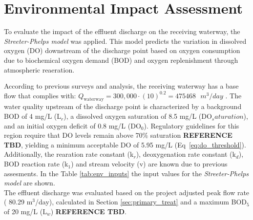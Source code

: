\documentclass[12pt]{article}
\begin{document}
\section{Environmental Impact Assessment}
\label{sec:env_impact}

To evaluate the impact of the effluent discharge on the receiving waterway, 
the \textit{Streeter-Phelps model} was applied. This model predicts the variation in dissolved 
oxygen (DO) downstream of the discharge point based on oxygen consumption due to biochemical 
oxygen demand (BOD) and oxygen replenishment through atmospheric reaeration.

According to previous surveys and analysis, the receiving waterway has a base flow that complies
with: 
\(Q_{\text{waterway}} = 300{,}000 \cdot \left(\text{10}\right)^{0.2} = 475468 \text{ } m^3/day\)
. The water quality upstream 
of the discharge point is characterized by a background BOD of 4 mg/L (L$_r$), a dissolved oxygen saturation 
of 8.5 mg/L (DO$_saturation$), and an initial oxygen deficit of 0.8 mg/L (DO$_0$). Regulatory guidelines for this region require 
that DO levels remain above 70\% saturation \textbf{REFERENCE TBD}, yielding a minimum acceptable DO of 5.95 mg/L (Eq~\eqref{eq:do_threshold}).
Additionally, the rearation rate constant (k$_r$), deoxygenation rate constant (k$_d$), BOD reaction rate
(k$_1$) and stream velocity (v) are known due to previous assesments. In the Table \ref{tab:env_inputs} the
input values for the \textit{Streeter-Phelps model} are shown.\\

The effluent discharge was evaluated based on the project adjusted 
peak flow rate (
80.29
m$^3$/day), calculated in Section \ref{sec:primary_treat} and a maximum BOD$_5$ of 20 mg/L (L$_w$) 
\textbf{REFERENCE TBD}. 
\end{document}
